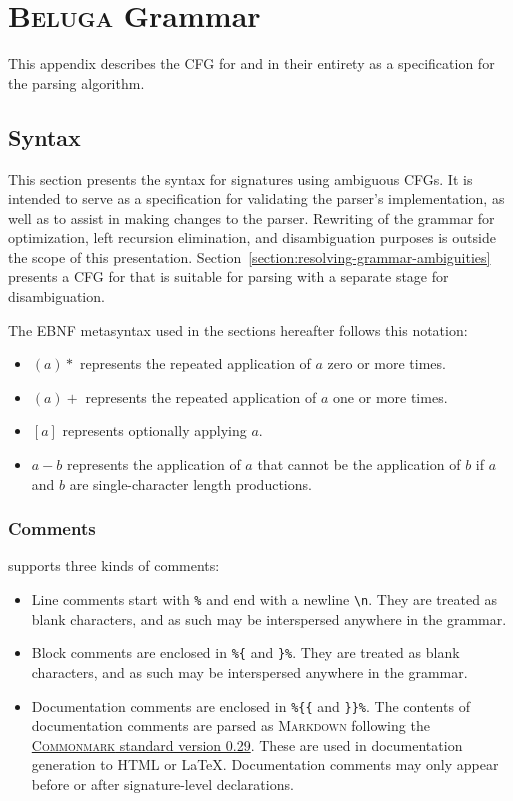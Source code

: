\chapter{\textsc{Beluga} Grammar}

This appendix describes the \ac{CFG} for \Beluga and \Harpoon in their entirety as a specification for the parsing algorithm.

\section{Syntax}\label{section:syntax}

This section presents the syntax for \Beluga signatures using ambiguous \acp{CFG}.
It is intended to serve as a specification for validating the parser's implementation, as well as to assist in making changes to the parser.
Rewriting of the grammar for optimization, left recursion elimination, and disambiguation purposes is outside the scope of this presentation.
Section~\ref{section:resolving-grammar-ambiguities} presents a \ac{CFG} for \Beluga that is suitable for parsing with a separate stage for disambiguation.

The \ac{EBNF} metasyntax used in the sections hereafter follows this notation:

\begin{itemize}
\item $ (a)* $ represents the repeated application of $ a $ zero or more times.
\item $ (a)+ $ represents the repeated application of $ a $ one or more times.
\item $ [a] $ represents optionally applying $ a $.
\item $ a - b $ represents the application of $ a $ that cannot be the application of $ b $ if $ a $ and $ b $ are single-character length productions.
\end{itemize}

\subsection{Comments}

\Beluga supports three kinds of comments:

\begin{itemize}
\item
Line comments start with \texttt{\%} and end with a newline \texttt{\textbackslash n}.
They are treated as blank characters, and as such may be interspersed anywhere in the grammar.
\item
Block comments are enclosed in \texttt{\%\{} and \texttt{\}\%}.
They are treated as blank characters, and as such may be interspersed anywhere in the grammar.
\item
Documentation comments are enclosed in \texttt{\%\{\{} and \texttt{\}\}\%}.
The contents of documentation comments are parsed as \textsc{Markdown} following the \href{https://spec.commonmark.org/0.29}{\textsc{Commonmark} standard version 0.29}.
These are used in documentation generation to \textsc{HTML} or \LaTeX.
Documentation comments may only appear before or after signature-level declarations.
\end{itemize}

